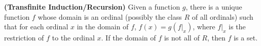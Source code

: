 \textbf{(Transfinite Induction/Recursion)} Given a function $g$, there is a unique function $f$ whose domain is an ordinal (possibly the class $R$ of all ordinals) such that for each ordinal $x$ in the domain of $f$, $f(x) = g(f|_{x})$, where $f|_{x}$ is the restriction of $f$ to the ordinal $x$. If the domain of $f$ is not all of $R$, then $f$ is a set.
